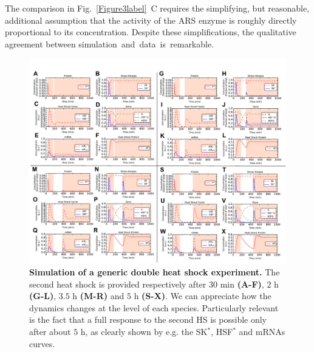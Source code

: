 \documentclass[oneside, 10pt, a4paper, twocolumn]{article}
\begin{document}
The comparison in Fig.~\ref{Figure3label}~C requires the simplifying, but  reasonable, additional assumption that the activity of the ARS enzyme is roughly directly proportional to its concentration. 
Despite these simplifications, the qualitative agreement between \mbox{simulation and data is remarkable.} 


\begin{figure}%
\centering
\includegraphics[width=\textwidth]{Figure7_SupMat.pdf}
\caption{\small{\textbf{Simulation of a generic double heat shock experiment.} The second heat shock is provided respectively after $30$ min \textbf{(A-F)}, $2$ h \textbf{(G-L)}, $3.5$ h \textbf{(M-R)} and $5$ h \textbf{(S-X)}. We can appreciate how the dynamics changes at the level of each species. Particularly relevant is the fact that a full response to the second HS is possible only after about $5$ h, as clearly shown by e.g. the SK$^*$, HSF$^*$ and mRNAs curves.}
}
\label{Figure7label}
\end{figure}
\end{document}

